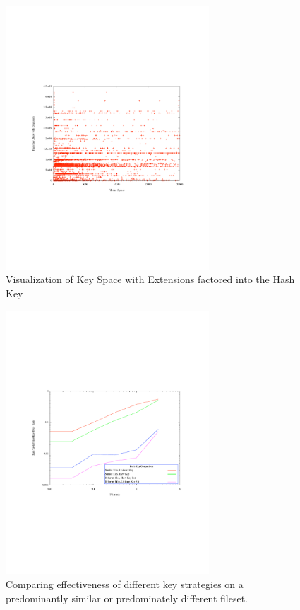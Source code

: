 \documentclass[10pt, twocolumn]{article}
\begin{document}
 \begin{figure}[h] 
 \centering
\includegraphics[width= 3in]{skewExtScatter.pdf}
\caption{Visualization of Key Space with Extensions factored into the Hash Key}
\label{scatterExtension} 
\end{figure}   

 \begin{figure}[h] 
 \centering
\includegraphics[width= 3in]{ratioSimDiff.pdf}
\caption{Comparing effectiveness of different key strategies on a predominantly similar or predominately different fileset.}
\label{simdiff} 
\end{figure}   

 \begin{figure}[h] 
 \centering
\caption{}
\label{performanceTest}
\end{figure}   
\end{document}
